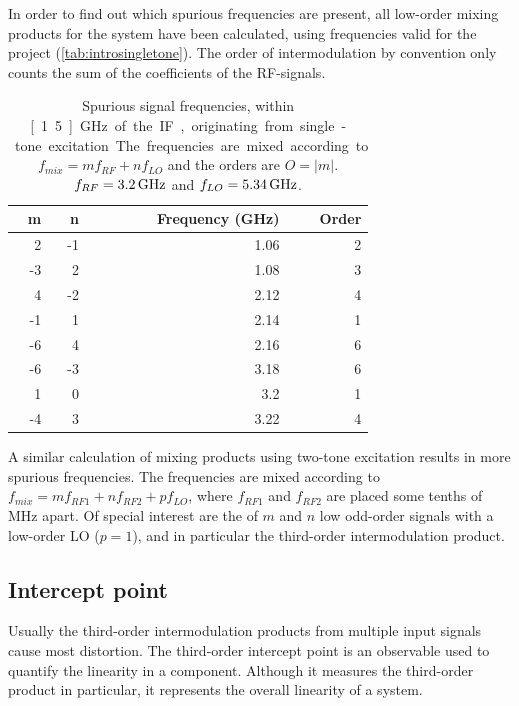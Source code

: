 			In order to find out which spurious frequencies are present, all low-order mixing products for the system have been calculated, using frequencies valid for the project (\autoref{tab:introsingletone}). %
			The order of intermodulation by convention only counts the sum of the coefficients of the RF-signals.
		
			\begin{table}[hbt!]
				\caption[Single-tone spurious signals.]{Spurious signal frequencies, within \unit[1.5]{GHz} of the IF, originating from single-tone excitation. The frequencies are mixed according to $f_{mix} = mf_{RF} + nf_{LO}$ and the orders are $O=|m|$. $ f_{RF}=\unit[3.2]{GHz}$ and $ f_{LO}=\unit[5.34]{GHz}$.}
				\label{tab:introsingletone}
				\centering
				\begin{tabular}{rrrr}
					m & n & Frequency (GHz) & Order \\\hline
					  2 &  -1 & 1.06 & 2 \\
					 -3 &   2 & 1.08 & 3 \\
					  4 &  -2 & 2.12 & 4 \\
					 -1 &   1 & 2.14 & 1 \\
					 -6 &   4 & 2.16 & 6 \\
					 -6 &  -3 & 3.18 & 6 \\
					  1 &   0 &  3.2 & 1 \\
					 -4 &   3 & 3.22 & 4
				\end{tabular}
			\end{table}

			A similar calculation of mixing products using two-tone excitation results in more spurious frequencies. The frequencies are mixed according to $f_{mix} = mf_{RF1} + nf_{RF2} + pf_{LO}$, where $f_{RF1}$ and $f_{RF2}$ are placed some tenths of MHz apart. Of special interest are the of $m$ and $n$ low odd-order signals with a low-order LO ($p=1$), and in particular the third-order intermodulation product.

		\subsection{Intercept point} \label{sec:ip3}
			Usually the third-order intermodulation products from multiple input signals cause most distortion. The third-order intercept point is an observable used to quantify the linearity in a component. Although it measures the third-order product in particular, it represents the overall linearity of a system.

